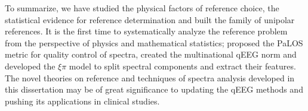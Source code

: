 \begin{englishabstract}
To summarize, we have studied the physical factors of reference choice, the statistical evidence for reference determination and built the family of unipolar references. It is the first time to systematically analyze the reference problem from the perspective of physics and mathematical statistics; proposed the PaLOS metric for quality control of spectra, created the multinational qEEG norm and developed the $\xi\pi$ model to split spectral components and extract their features. The novel theories on reference and techniques of spectra analysis developed in this dissertation may be of great significance to updating the qEEG methods and pushing its applications in clinical studies.

\end{englishabstract}
